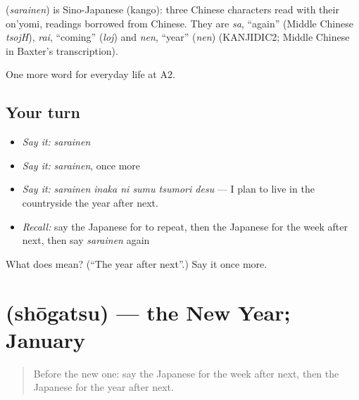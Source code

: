 \begin{cousinweb}
\textbf{} (\emph{sarainen}) is Sino-Japanese (kango): three Chinese characters read with their on'yomi, readings borrowed from Chinese. They are \emph{sa}, \textquotedblleft{}again\textquotedblright{} (Middle Chinese \emph{tsojH}), \emph{rai}, \textquotedblleft{}coming\textquotedblright{} (\emph{loj}) and \emph{nen}, \textquotedblleft{}year\textquotedblright{} (\emph{nen}) (KANJIDIC2; Middle Chinese in Baxter's transcription).
\end{cousinweb}

\begin{grammarlens}[title={What you've built}]
One more word for everyday life at A2.
\end{grammarlens}

\subsection*{Your turn}
\begin{itemize}
\raggedright
  \item \emph{Say it:} \emph{sarainen}
  \item \emph{Say it:} \emph{sarainen}, once more
  \item \emph{Say it:} \emph{sarainen inaka ni sumu tsumori desu} — I plan to live in the countryside the year after next.
  \item \emph{Recall:} say the Japanese for to repeat, then the Japanese for the week after next, then say \emph{sarainen} again
\end{itemize}

\begin{tcolorbox}[breakable,colback=teal!4,colframe=teal!35!black,title={Before you move on}]
What does  mean? (\textquotedblleft{}The year after next\textquotedblright{}.) Say it once more.
\end{tcolorbox}
\section[\texorpdfstring{\ja{しょうがつ} (shōgatsu)}{しょうがつ (shōgatsu)}]{ (shōgatsu) — the New Year; January}

\label{lesson:JA-C170-shougatsu}



\begin{quote}
Before the new one: say the Japanese for the week after next, then the Japanese for the year after next.
\end{quote}

